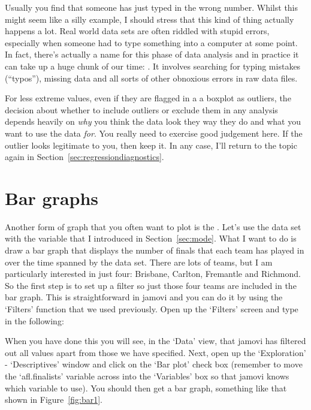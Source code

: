 Usually you find that someone has just typed in the wrong number. Whilst this might seem like a silly example, I should stress that this kind of thing actually happens a lot. Real world data sets are often riddled with stupid errors, especially when someone had to type something into a computer at some point. In fact, there's actually a name for this phase of data analysis and in practice it can take up a huge chunk of our time: . It involves searching for typing mistakes (``typos''), missing data and all sorts of other obnoxious errors in raw data files.

For less extreme values, even if they are flagged in a a boxplot as outliers, the decision about whether to include outliers or exclude them in any analysis depends heavily on {\it why} you think the data look they way they do and what you want to use the data {\it for}. You really need to exercise good judgement here. If the outlier looks legitimate to you, then keep it. In any case, I'll return to the topic again in Section~\ref{sec:regressiondiagnostics}. 


\section{Bar graphs\label{sec:bargraph}}

Another form of graph that you often want to plot is the . Let's use the  data set with the  variable that I introduced in Section~\ref{sec:mode}. What I want to do is draw a bar graph that displays the number of finals that each team has played in over the time spanned by the  data set. There are lots of teams, but I am particularly interested in just four: Brisbane, Carlton, Fremantle and Richmond. So the first step is to set up a filter so just those four teams are included in the bar graph. This is straightforward in jamovi and you can do it by using the `Filters' function that we used previously. Open up the `Filters' screen and type in the following: 

{}  

When you have done this you will see, in the `Data' view, that jamovi has filtered out all values apart from those we have specified. Next, open up the `Exploration' - `Descriptives' window and click on the `Bar plot' check box (remember to move the `afl.finalists' variable across into the `Variables' box so that jamovi knows which variable to use). You should then get a bar graph, something like that shown in Figure~\ref{fig:bar1}.

